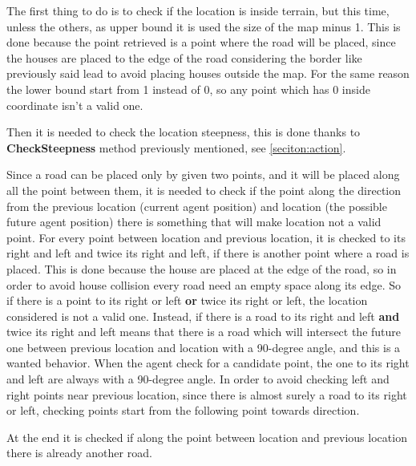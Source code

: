 \documentclass[12pt]{article}
\begin{document}
    The first thing to do is to check if the location is inside terrain, but this time, unless the others, as upper bound it is used the size of the map minus 1. This is done
    because the point retrieved is a point where the road will be placed, since the houses are placed to the edge of the road considering the border like previously said
    lead to avoid placing houses outside the map. For the same reason the lower bound start from 1 instead of 0, so any point which has 0 inside coordinate isn't a valid one.

    Then it is needed to check the location steepness, this is done thanks to \textbf{CheckSteepness} method previously mentioned, see \ref{seciton:action}.

    Since a road can be placed only by given two points, and it will be placed along all the point between them, it is needed to check if the point along the direction
    from the previous location (current agent position) and location (the possible future agent position) there is something that will make location not 
    a valid point. For every point between location and previous location, it is checked to its right and left and twice its right and left, if there is another point where
    a road is placed. This is done because the house are placed at the edge of the road, so in order to avoid house collision every road need an empty space along
    its edge. So if there is a point to its right or left \textbf{or} twice its right or left, the location considered is not a valid one. Instead, if there is a road to
    its right and left \textbf{and} twice its right and left means that there is a road which will intersect the future one between previous location and location with a 
    90-degree angle, and this is a wanted behavior. When the agent check for a candidate point, the one to its right and left are always with a 90-degree angle. 
    In order to avoid checking left and right points near previous location, since there is almost surely a road to its right or left, checking points start from the 
    following point towards direction.
    
    At the end it is checked if along the point between location and previous location there is already another road.
\end{document}
